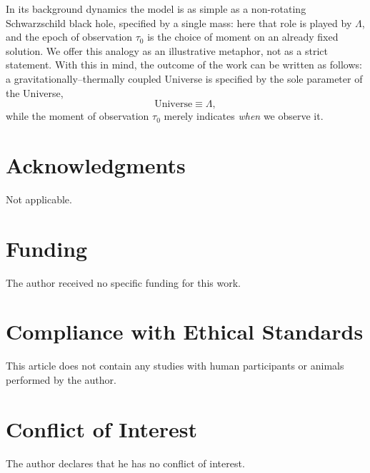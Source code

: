 \documentclass[10pt,a4paper]{article}
\begin{document}
In its background dynamics the model is as simple as a non-rotating Schwarzschild black hole, specified by a single mass: here that role is played by $\Lambda$, and the epoch of observation $\tau_0$ is the choice of moment on an already fixed solution. We offer this analogy as an illustrative metaphor, not as a strict statement. With this in mind, the outcome of the work can be written as follows: a gravitationally--thermally coupled Universe is specified by the sole parameter of the Universe,
\begin{equation}
\boxed{\text{Universe} \equiv \Lambda,}
\end{equation}
while the moment of observation $\tau_0$ merely indicates \emph{when} we observe it.


\section*{Acknowledgments}

Not applicable.

\section*{Funding}

The author received no specific funding for this work.

\section*{Compliance with Ethical Standards}

This article does not contain any studies with human participants or animals performed by the author.

\section*{Conflict of Interest}

The author declares that he has no conflict of interest.



\end{document}
